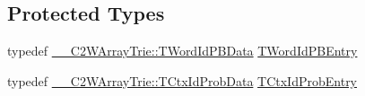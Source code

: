 \subsection*{Protected Types}
\begin{DoxyCompactItemize}
\item 
typedef \hyperlink{structuva_1_1smt_1_1tries_1_1_____c2_w_array_trie_1_1_t_word_id_p_b_data}{\+\_\+\+\_\+\+C2\+W\+Array\+Trie\+::\+T\+Word\+Id\+P\+B\+Data} \hyperlink{classuva_1_1smt_1_1tries_1_1_c2_w_array_trie_a4d11cb1cedcd781beb984118ecf04e98}{T\+Word\+Id\+P\+B\+Entry}
\item 
typedef \hyperlink{structuva_1_1smt_1_1tries_1_1_____c2_w_array_trie_1_1_t_ctx_id_prob_data}{\+\_\+\+\_\+\+C2\+W\+Array\+Trie\+::\+T\+Ctx\+Id\+Prob\+Data} \hyperlink{classuva_1_1smt_1_1tries_1_1_c2_w_array_trie_a73c5b0ccfd13b6537d58abefd2cc5745}{T\+Ctx\+Id\+Prob\+Entry}
\end{DoxyCompactItemize}
